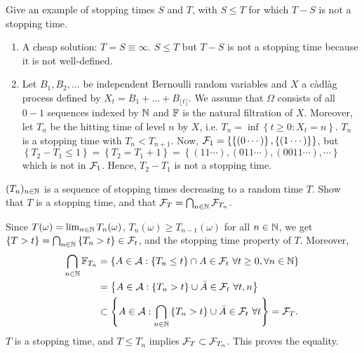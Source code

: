  Give an example of stopping times $S$
and $T$, with $S\leq T$ for which $T-S$ is not a stopping time. 

\solution
\begin{enumerate}
    \item A cheap solution: $T=S\equiv\infty$. $S\leq T$ but $T-S$ is not a stopping
        time because it is not well-defined.

    \item Let $B_1, B_2,\dots $ be independent Bernoulli random variables and
        $X$ a c\`adl\`ag process defined by $X_t = B_1 + \dots + B_{\lfloor t
        \rfloor}$.  We assume that $\Omega$ consists of all $0-1$ sequences
        indexed by $\mathbb N$ and $\mathbb F$ is the natural filtration of $X$. Moreover,
        let $T_n$ be the hitting time of level $n$ by $X$, i.e. $T_n = \inf
        \left\{ t\geq 0 : X_t = n  \right\}$. $T_n$ is a stopping time with
        $T_n < T_{n+1}$. Now, $\mathcal F_{1} = \left\{ \left\{ (0\cdots) \right\},
        \left\{ (1\cdots) \right\} \right\}$, but $\left\{ T_2 - T_1 \leq 1
        \right\} = \left\{ T_2 = T_1 + 1 \right\} = \left\{ (11\cdots),
            (011\cdots), (0011\cdots), \cdots \right\}$ which is not in $\mathcal F_1$. 
        Hence, $T_2 - T_1$ is not a stopping time. 
\end{enumerate}

$(T_n)_{n\in\mathbb N}$ is a sequence of stopping times decreasing to a random time
$T$. Show that $T$ is a stopping time, and that $\mathcal F_{T} = \bigcap_{n\in\mathbb N}
\mathcal F_{T_n}$. 

\solution 
Since $T(\omega) = \lim_{n\in\mathbb N} T_{n}(\omega)$, $T_{n}(\omega) \geq
T_{n-1}(\omega)$ for all $n\in\mathbb N$, we get $\left\{ T>t \right\} =
\bigcap_{n\in\mathbb N} \left\{ T_{n}>t \right\} \in \mathcal F_{t}$, and the stopping time
property of $T$. Moreover, 
\begin{align*}
    \bigcap_{n\in\mathbb N} \mathbb F_{T_{n}} &= \left\{ A\in\mathcal A : \left\{ T_n\leq t \right\}\cap A \in \mathcal F_{t} \ \forall t\geq 0,\forall n\in\mathbb N \right\} \\
    &= \left\{ A \in \mathcal A : \left\{ T_{n}>t \right\}\cup \bar A \in\mathcal F_{t} \ \forall t,n \right\} \\
    &\subset \left\{A\in\mathcal A :\bigcap_{n\in\mathbb N} \left\{T_{n}>t\right\} \cup \bar A\in\mathcal F_t \ \forall t \right\}
    = \mathcal F_{T}.
\end{align*}
$T$ is a stopping time, and $T\leq T_n$ implies $\mathcal F_{T} \subset \mathcal F_{T_{n}}$.
This proves the equality.

